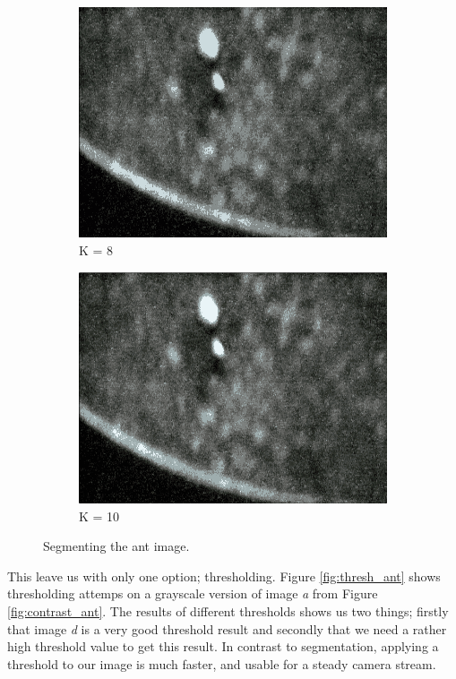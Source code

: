 \begin{figure}
\begin{subfigure}[b]{0.4\textwidth}
                \includegraphics[scale = 0.2]{img/segment8}
                \caption{K = 8}
        \end{subfigure}
		\quad
        \begin{subfigure}[b]{0.4\textwidth}
                \includegraphics[scale = 0.2]{img/segment10}
                \caption{K = 10}
        \end{subfigure}
		\caption{Segmenting the ant image.}
		\label{fig:segment_ant}
\end{figure}

This leave us with only one option; thresholding. Figure \ref{fig:thresh_ant} shows thresholding attemps on a grayscale version of image \emph{a} from Figure \ref{fig:contrast_ant}. The results of different thresholds shows us two things; firstly that image \emph{d} is a very good threshold result and secondly that we need a rather high threshold value to get this result. In contrast to segmentation, applying a threshold to our image is much faster, and usable for a steady camera stream.\\

